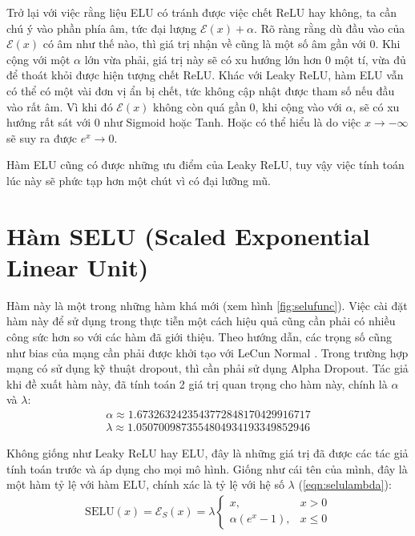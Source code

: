 Trở lại với việc rằng liệu ELU có tránh được việc chết ReLU hay không, ta cần chú ý vào phần phía âm, tức đại lượng $\mathcal{E}(x) + \alpha$.
Rõ ràng rằng dù đầu vào của $\mathcal{E}(x)$ có âm như thế nào, thì giá trị nhận về cũng là một số âm gần với 0.
Khi cộng với một $\alpha$ lớn vừa phải, giá trị này sẽ có xu hướng lớn hơn 0 một tí, vừa đủ để thoát khỏi được hiện tượng chết ReLU.
Khác với Leaky ReLU, hàm ELU vẫn có thể có một vài đơn vị ẩn bị chết, tức không cập nhật được tham số nếu đầu vào rất âm.
Vì khi đó $\mathcal{E}(x)$ không còn quá gần 0, khi cộng vào với $\alpha$, sẽ có xu hướng rất sát với 0 như Sigmoid hoặc Tanh.
Hoặc có thể hiểu là do việc $x \rightarrow -\infty$ sẽ suy ra được $e^x \rightarrow 0$.
\vspace{5pt}

Hàm ELU cũng có được những ưu điểm của Leaky ReLU, tuy vậy việc tính toán lúc này sẽ phức tạp hơn một chút vì có đại lưỡng mũ.

\section{Hàm SELU (Scaled Exponential Linear Unit)}\label{sec:hamselu}

Hàm này \cite{klambauer2017selfnormalizing} là một trong những hàm khá mới (xem hình \ref{fig:selufunc}).
Việc cài đặt hàm này để sử dụng trong thực tiễn một cách hiệu quả cũng cần phải có nhiều công sức hơn so với các hàm đã giới thiệu.
Theo hướng dẫn, các trọng số cũng như bias của mạng cần phải được khởi tạo với LeCun Normal \cite{activationcasper}.
Trong trường hợp mạng có sử dụng kỹ thuật dropout, thì cần phải sử dụng Alpha Dropout.
Tác giả khi đề xuất hàm này, đã tính toán 2 giá trị quan trọng cho hàm này, chính là $\alpha$ và $\lambda$:
\begin{align}
    \alpha \approx 1.6732632423543772848170429916717 \label{eqn:selualpha}\\
    \lambda \approx 1.0507009873554804934193349852946 \label{eqn:selulambda}
\end{align}

Không giống như Leaky ReLU hay ELU, đây là những giá trị đã được các tác giả tính toán trước và áp dụng cho mọi mô hình.
Giống như cái tên của mình, đây là một hàm tỷ lệ với hàm ELU, chính xác là tỷ lệ với hệ số $\lambda$ (\ref{eqn:selulambda}):
\begin{align}
    \text{SELU}(x) = \mathcal{E}_S(x) = \lambda \begin{cases}x, &x > 0\\\alpha\left(e^x - 1\right), &x \le 0\end{cases}
\end{align}

